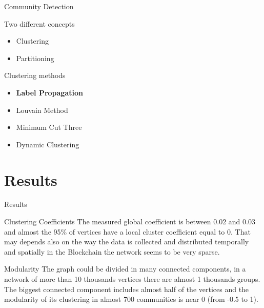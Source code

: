 \documentclass{beamer}
\begin{document}
    \begin{frame}{Community Detection}
        \begin{block}{Two different concepts}
            \begin{itemize}
                \item Clustering
                \item Partitioning
            \end{itemize}
        \end{block}
        \begin{block}{Clustering methods}
            \begin{itemize}
                \item \textbf{Label Propagation}
                \item Louvain Method
                \item Minimum Cut Three
                \item Dynamic Clustering
            \end{itemize}
        \end{block}

    \end{frame}

    \section{Results}\label{sec:results}

    \begin{frame}{Results}
        \begin{block}{Clustering Coefficients}
            The measured global coefficient is between 0.02 and 0.03 and almost the 95\% of vertices have a local cluster coefficient equal to 0.
            That may depends also on the way the data is collected and distributed temporally and spatially in the Blockchain the network seems to be very sparse.
        \end{block}

        \vskip 0.75cm

        \begin{block}{Modularity}
            The graph could be divided in many connected components, in a network of more than 10 thousands vertices there are almost 1 thousands groups.
            The biggest connected component includes almost half of the vertices and the modularity of its clustering in almost 700 communities is near 0 (from -0.5 to 1).
        \end{block}
    \end{frame}
\end{document}

